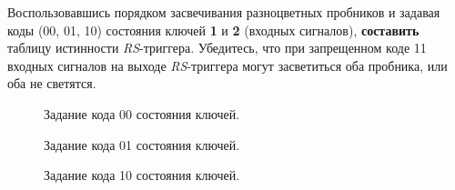 \documentclass[bachelor, och, otchet, hidelinks]{SCWorks}
\begin{document}
\newpage

Воспользовавшись порядком засвечивания разноцветных пробников и задавая коды (00, 01, 10) состояния ключей 
\textbf{1} и \textbf{2} (входных сигналов), \textbf{составить} таблицу истинности \textit{RS}-триггера. Убедитесь, 
что при запрещенном коде 11 входных сигналов на выходе \textit{RS}-триггера могут засветиться оба пробника, 
или оба не светятся.

\begin{figure}[h]
	\caption{Задание кода 00 состояния ключей.}
\end{figure}

\begin{figure}[h]
	\caption{Задание кода 01 состояния ключей.}
\end{figure}

\newpage

\begin{figure}[h]
	\caption{Задание кода 10 состояния ключей.}
\end{figure}
\end{document}
